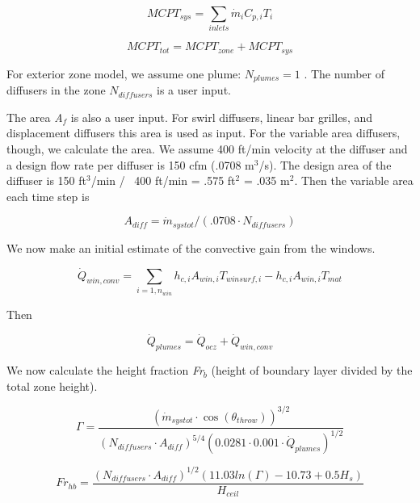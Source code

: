 \begin{equation}
MCP{T_{sys}} = \sum\limits_{inlets} {{{\dot m}_i}} {C_{p,i}}{T_i}
\end{equation}

\begin{equation}
MCP{T_{tot}} = MCP{T_{zone}} + MCP{T_{sys}}
\end{equation}

For exterior zone model, we assume one plume: \({N_{plumes}} = 1\) . The number of diffusers in the zone \({N_{diffusers}}\) is a user input.

The area \emph{A\(_{f}\)} is also a user input. For swirl diffusers, linear bar grilles, and displacement diffusers this area is used as input. For the variable area diffusers, though, we calculate the area. We assume 400 ft/min velocity at the diffuser and a design flow rate per diffuser is 150 cfm (.0708 m\(^{3}\)/s). The design area of the diffuser is 150 ft\(^{3}\)/min /~ 400 ft/min = .575 ft\(^{2}\) = .035 m\(^{2}\). Then the variable area each time step is

\begin{equation}
{A_{diff}} = {\dot m_{systot}}/(.0708\cdot {N_{diffusers}})
\end{equation}

We now make an initial estimate of the convective gain from the windows.

\begin{equation}
{\dot Q_{win,conv}} = \sum\limits_{i = 1,{n_{win}}} {{h_{c,i}}} {A_{win,i}}{T_{winsurf,i}} - {h_{c,i}}{A_{win,i}}{T_{mat}}
\end{equation}

Then

\begin{equation}
{\dot Q_{plumes}} = {\dot Q_{ocz}} + {\dot Q_{win,conv}}
\end{equation}

We now calculate the height fraction \emph{Fr\(_{b}\)} (height of boundary layer divided by the total zone height).

\begin{equation}
\Gamma  = \frac{{{{({{\dot m}_{systot}}\cdot \cos ({\theta_{throw}}))}^{3/2}}}}{{{{({N_{diffusers}}\cdot {A_{diff}})}^{5/4}}{{(0.0281\cdot 0.001\cdot {{\dot Q}_{plumes}})}^{1/2}}}}
\end{equation}

\begin{equation}
F{r_{hb}} = \frac{{{{({N_{diffusers}}\cdot {A_{diff}})}^{1/2}}(11.03ln(\Gamma ) - 10.73 + 0.5{H_s})}}{{{H_{ceil}}}}
\end{equation}

